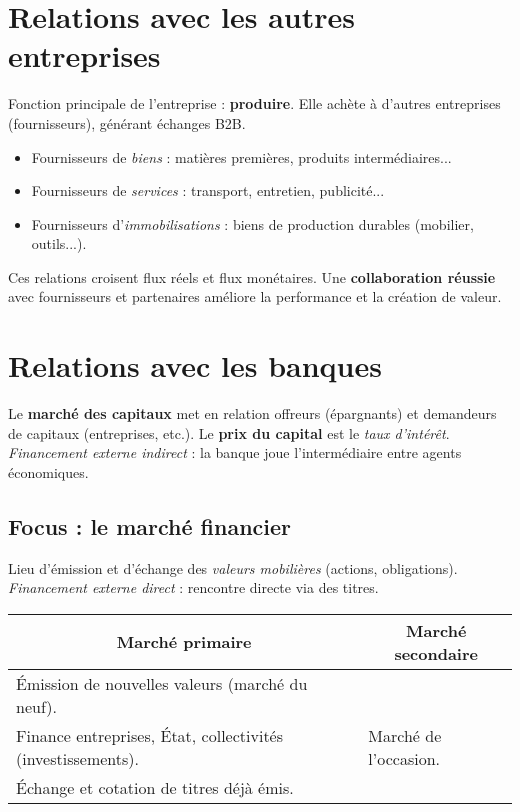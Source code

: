 \documentclass[12pt,a4paper]{article}
\begin{document}
\section{Relations avec les autres entreprises}
Fonction principale de l'entreprise : \textbf{produire}. Elle achète à d'autres entreprises (fournisseurs), générant échanges B2B.
\begin{itemize}
  \item Fournisseurs de \textit{biens} : matières premières, produits intermédiaires...
  \item Fournisseurs de \textit{services} : transport, entretien, publicité...
  \item Fournisseurs d'\textit{immobilisations} : biens de production durables (mobilier, outils...).
\end{itemize}
Ces relations croisent flux réels et flux monétaires. Une \textbf{collaboration réussie} avec fournisseurs et partenaires améliore la performance et la création de valeur.

\section{Relations avec les banques}
Le \textbf{marché des capitaux} met en relation offreurs (épargnants) et demandeurs de capitaux (entreprises, etc.). Le \textbf{prix du capital} est le \textit{taux d'intérêt}.\\
\textit{Financement externe indirect} : la banque joue l'intermédiaire entre agents économiques.

\subsection*{Focus : le marché financier}
Lieu d'émission et d'échange des \textit{valeurs mobilières} (actions, obligations). \textit{Financement externe direct} : rencontre directe via des titres.

\begin{tabularx}{\textwidth}{@{}p{} p{}@{}}
\multicolumn{1}{c}{\textbf{Marché primaire}} & \multicolumn{1}{c}{\textbf{Marché secondaire}} \\
\midrule
Émission de nouvelles valeurs (marché du neuf).\\
Finance entreprises, État, collectivités (investissements). & Marché de l'occasion.\\
Échange et cotation de titres déjà émis. \\
\end{tabularx}
\end{document}
